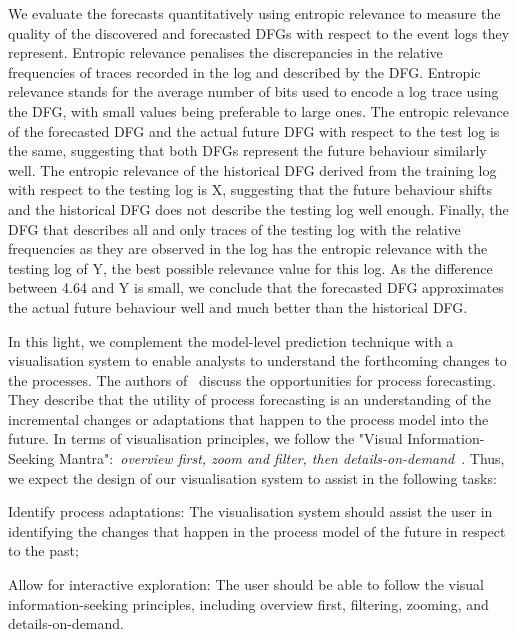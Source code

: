 We evaluate the forecasts quantitatively using entropic relevance \cite{DBLP:conf/icpm/PolyvyanyyMG20} to measure the quality of the discovered and forecasted DFGs with respect to the event logs they represent. 
Entropic relevance penalises the discrepancies in the relative frequencies of traces recorded in the log and described by the DFG. Entropic relevance stands for the average number of bits used to encode a log trace using the DFG, with small values being preferable to large ones.
The entropic relevance of the forecasted DFG and the actual future DFG with respect to the test log is the same, suggesting that both DFGs represent the future behaviour similarly well. 
The entropic relevance of the historical DFG derived from the training log with respect to the testing log is X, suggesting that the future behaviour shifts and the historical DFG does not describe the testing log well enough. 
Finally, the DFG that describes all and only traces of the testing log with the relative frequencies as they are observed in the log has the entropic relevance with the testing log of Y, the best possible relevance value for this log. As the difference between 4.64 and Y is small, we conclude that the forecasted DFG approximates the actual future behaviour well and much better than the historical DFG.

In this light, we complement the model-level prediction technique with a visualisation system to enable analysts to understand the forthcoming changes to the processes. The authors of~\cite{DBLP:conf/bpm/PollPRRR18} discuss the opportunities for process forecasting. They describe that the utility of process forecasting is an understanding of the incremental changes or adaptations that happen to the process model into the future. In terms of visualisation principles, we follow the "Visual Information-Seeking Mantra":~\emph{overview first, zoom and filter, then details-on-demand}~\cite{DBLP:conf/vl/Shneiderman96}. 
Thus, we expect the design of our visualisation system to assist in the following tasks:

\begin{requidescr}
	\item[Identify process adaptations:\namedlabel{req:adaptation}] The visualisation system should assist the user in identifying the changes that happen in the process model of the future in respect to the past;
	\item[Allow for interactive exploration:\namedlabel{req:interactive}] The user should be able to follow the visual information-seeking principles, including overview first, filtering, zooming, and details-on-demand.
\end{requidescr} %

